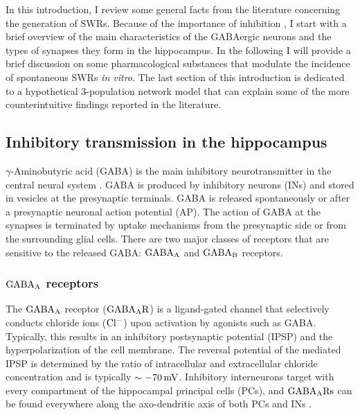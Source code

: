   In this introduction, I review some general facts from the literature
  concerning the generation of SWRs. Because of the importance of inhibition
  \citep[e.g.,][]{Maier2003, Schlingloff2014}, I start with a brief overview of
  the main characteristics of the GABAergic neurons and the types of synapses
  they form in the hippocampus. In the following I will provide a brief
  discussion on some pharmacological substances that modulate the incidence of
  spontaneous SWRs \textit{in vitro}. The last section of this introduction is
  dedicated to a hypothetical 3-population network model that can explain some
  of the more counterintuitive findings reported in the literature. 

  \subsection{Inhibitory transmission in the hippocampus}
    $\gamma$-Aminobutyric acid (GABA) is the main inhibitory neurotransmitter
    in the central neural system \citep{Sivilotti1991}. GABA is produced by
    inhibitory neurons (INs) and stored in vesicles at the presynaptic
    terminals. GABA is released spontaneously or after a presynaptic neuronal
    action potential (AP). The action of GABA at the synapses is terminated by
    uptake mechanisms from the presynaptic side or from the surrounding glial
    cells. There are two major classes of receptors that are sensitive to the
    released GABA: $\rm GABA_A$ and $\rm GABA_B$ receptors. 

    \subsubsection{$\rm GABA_A$ receptors}
    \label{sec:gabaa}
      The $\rm GABA_A $ receptor ($\rm GABA_A R$) is a ligand-gated channel
      that selectively conducts chloride ions ($\rm Cl^-$) upon activation by
      agonists such as GABA. Typically, this results in an inhibitory
      postsynaptic potential (IPSP) and the hyperpolarization of the cell
      membrane. The reversal potential of the mediated IPSP is determined by
      the ratio of intracellular and extracellular chloride concentration and
      is typically $\sim -70\, \rm mV$. Inhibitory interneurons target with
      every compartment of the hippocampal principal cells (PCs), and $\rm
      GABA_ARs$ can be found everywhere along the axo-dendritic axis of both
      PCs and INs \citep{Kullmann2005}.

